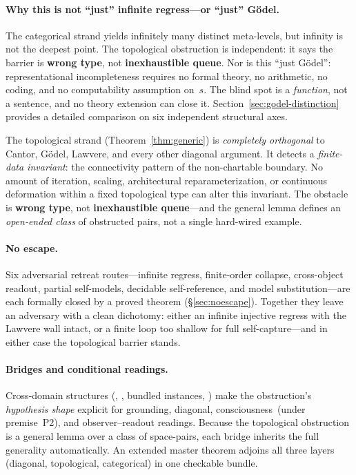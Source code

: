 \documentclass[11pt]{article}
\begin{document}
\paragraph{Why this is not ``just'' infinite regress---or ``just'' G\"odel.}
The categorical strand yields infinitely many distinct meta-levels, but
infinity is not the deepest point.  The topological obstruction is
independent: it says the barrier is \textbf{wrong type}, not
\textbf{inexhaustible queue}.  Nor is this ``just G\"odel'':
representational incompleteness requires no formal theory, no arithmetic,
no coding, and no computability assumption on~$s$.  The blind spot is a
\emph{function}, not a sentence, and no theory extension can close it.
Section~\ref{sec:godel-distinction} provides a detailed comparison
on six independent structural axes.

\begin{keybox}[title=The topological barrier is independent of diagonalization]
The topological strand (Theorem~\ref{thm:generic}) is
\emph{completely orthogonal} to Cantor, G\"odel, Lawvere, and every
other diagonal argument.  It detects a \emph{finite-data invariant}:
the connectivity pattern of the non-chartable boundary.  No amount
of iteration, scaling, architectural reparameterization, or
continuous deformation within a fixed topological type can alter
this invariant.  The obstacle is \textbf{wrong type}, not
\textbf{inexhaustible queue}---and the general lemma defines an
\emph{open-ended class} of obstructed pairs, not a single hard-wired
example.
\end{keybox}

\paragraph{No escape.}
Six adversarial retreat routes---infinite regress, finite-order
collapse, cross-object readout, partial self-models, decidable
self-reference, and model substitution---are each formally closed by
a proved theorem (\S\ref{sec:noescape}).  Together they leave an
adversary with a clean dichotomy: either an infinite injective
regress with the Lawvere wall intact, or a finite loop too shallow
for full self-capture---and in either case the topological barrier
stands.

\paragraph{Bridges and conditional readings.}
Cross-domain structures
(,
,
bundled  instances,
)
make the obstruction's \emph{hypothesis shape} explicit for grounding,
diagonal, consciousness~(under premise~P2), and observer--readout
readings.  Because the topological obstruction is a general lemma over
a class of space-pairs, each bridge inherits the full generality
automatically.  An extended master theorem adjoins all three layers
(diagonal, topological, categorical) in one checkable bundle.
\end{document}
